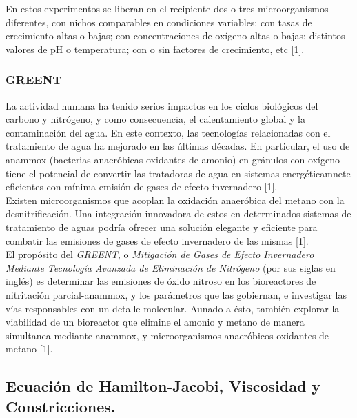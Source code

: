 \documentclass[letterpaper]{article}
\begin{document}
{{            \normalsize{En estos experimentos se liberan en el recipiente dos o tres microorganismos diferentes, con nichos comparables en condiciones variables; con tasas de crecimiento altas o bajas; con concentraciones de oxígeno altas o bajas; distintos valores de pH o temperatura; con o sin factores de crecimiento, etc [1].}

            \subsubsection{GREENT}{

                \normalsize{La  actividad humana ha tenido serios impactos en los ciclos biológicos del carbono y nitrógeno, y como consecuencia, el calentamiento global y la contaminación del agua. En este contexto, las tecnologías relacionadas con el tratamiento de agua ha mejorado en las últimas décadas. En particular, el uso de anammox (bacterias anaeróbicas oxidantes de amonio) en gránulos con oxígeno tiene el potencial de convertir las tratadoras de agua en sistemas energéticamnete eficientes con mínima emisión de gases de efecto invernadero [1].}\\

                \normalsize{Existen microorganismos que acoplan la oxidación anaeróbica del metano con la desnitrificación. Una integración innovadora de estos en determinados sistemas de tratamiento de aguas podría ofrecer una solución elegante y eficiente para combatir las emisiones de gases de efecto invernadero de las mismas [1].}\\
                
                \normalsize{El propósito del \textit{GREENT}, o \textit{Mitigación de Gases de Efecto Invernadero Mediante Tecnología Avanzada de Eliminación de Nitrógeno} (por sus siglas en inglés) es determinar las emisiones de óxido nitroso en los bioreactores de nitritación parcial-anammox, y los parámetros que las gobiernan, e investigar las vías responsables con un detalle molecular. Aunado a ésto, también explorar la viabilidad de un bioreactor que elimine el amonio y metano de manera simultanea mediante anammox, y microorganismos anaeróbicos oxidantes de metano [1].}
            
            }
        
        }

        \subsection{Ecuación de Hamilton-Jacobi, Viscosidad y Constricciones.}
    
    }
\end{document}

